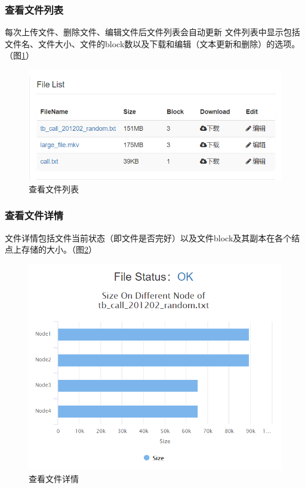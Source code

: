 \documentclass[12pt,a4paper]{article}
\begin{document}
\subsubsection{查看文件列表}
每次上传文件、删除文件、编辑文件后文件列表会自动更新
文件列表中显示包括文件名、文件大小、文件的block数以及下载和编辑（文本更新和删除）的选项。（图\ref{list_1}）
\begin{figure}[htb]
\centering
\includegraphics[width=14cm]{list_1}
\caption{查看文件列表 \label{list_1}}
\end{figure}

\subsubsection{查看文件详情}
文件详情包括文件当前状态（即文件是否完好）以及文件block及其副本在各个结点上存储的大小。（图\ref{detail_1}）
\begin{figure}[htb]
\centering
\includegraphics[width=14cm]{detail_1}
\caption{查看文件详情 \label{detail_1}}
\end{figure}
\end{document}
